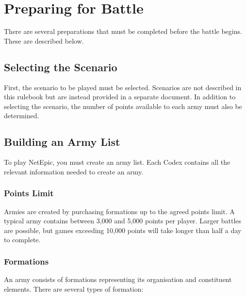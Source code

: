 \section{Preparing for Battle}

There are several preparations that must be completed before the battle begins. These are described below.

\subsection{Selecting the Scenario}

First, the scenario to be played must be selected. Scenarios are not described in this rulebook but are instead provided in a separate document. In addition to selecting the scenario, the number of points available to each army must also be determined.

\subsection{Building an Army List}

To play NetEpic, you must create an army list. Each Codex contains all the relevant information needed to create an army.

\subsubsection{Points Limit}

Armies are created by purchasing formations up to the agreed points limit. A typical army contains between 3,000 and 5,000 points per player. Larger battles are possible, but games exceeding 10,000 points will take longer than half a day to complete.

\subsubsection{Formations}

An army consists of formations representing its organisation and constituent elements. There are several types of formation:

